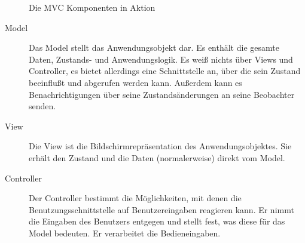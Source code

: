 \documentclass[11pt,a4paper,titlepage]{scrreprt}
\begin{document}
\begin{figure}[h]
\caption{Die MVC Komponenten in Aktion}
\end{figure}

\begin{description}
\item[Model]
Das  Model stellt das Anwendungsobjekt dar. Es enthält die gesamte Daten, Zustands-
und Anwendungslogik. Es weiß nichts über Views und Controller, es bietet allerdings eine
Schnittstelle an, über die sein Zustand beeinflußt und abgerufen werden kann. Außerdem
kann es Benachrichtigungen über seine Zustandsänderungen an seine Beobachter senden.

\item[View]
Die View ist die Bildschirmrepräsentation des Anwendungsobjektes. Sie erhält den Zustand
und die Daten (normalerweise) direkt vom Model.

\item[Controller]
Der Controller bestimmt die Möglichkeiten, mit denen die Benutzungsschnittstelle auf
Benutzereingaben reagieren kann. Er nimmt die Eingaben des Benutzers entgegen und stellt
fest, was diese für das Model bedeuten. Er verarbeitet die Bedieneingaben.
\end{description}
\end{document}
